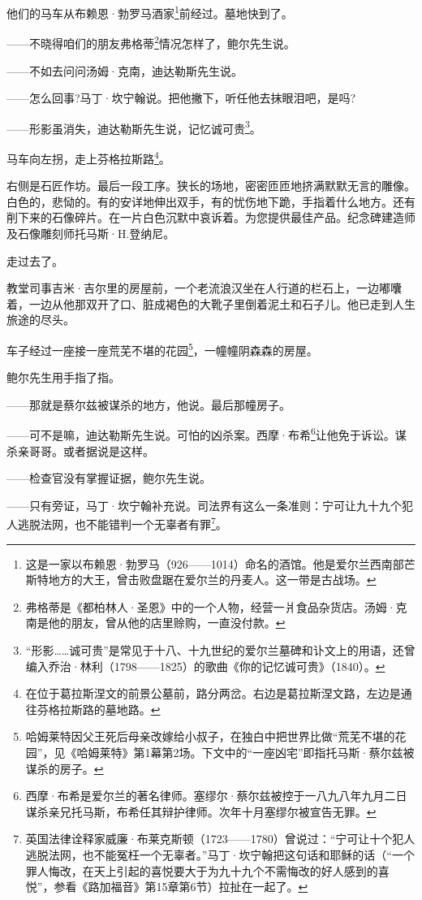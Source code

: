 \par 他们的马车从布赖恩·勃罗马酒家\footnote{这是一家以布赖恩·勃罗马（926——1014）命名的酒馆。他是爱尔兰西南部芒斯特地方的大王，曾击败盘踞在爱尔兰的丹麦人。这一带是古战场。}前经过。墓地快到了。
\par ——不晓得咱们的朋友弗格蒂\footnote{弗格蒂是《都柏林人·圣恩》中的一个人物，经营一爿食品杂货店。汤姆·克南是他的朋友，曾从他的店里赊购，一直没付款。}情况怎样了，鲍尔先生说。
\par ——不如去问问汤姆·克南，迪达勒斯先生说。
\par ——怎么回事?马丁·坎宁翰说。把他撇下，听任他去抹眼泪吧，是吗?
\par ——形影虽消失，迪达勒斯先生说，记忆诚可贵\footnote{“形影……诚可贵”是常见于十八、十九世纪的爱尔兰墓碑和讣文上的用语，还曾编入乔治·林利（1798——1825）的歌曲《你的记忆诚可贵》（1840）。}。
\par 马车向左拐，走上芬格拉斯路\footnote{在位于葛拉斯涅文的前景公墓前，路分两岔。右边是葛拉斯涅文路，左边是通往芬格拉斯路的墓地路。}。
\par 右侧是石匠作坊。最后一段工序。狭长的场地，密密匝匝地挤满默默无言的雕像。白色的，悲恸的。有的安详地伸出双手，有的忧伤地下跪，手指着什么地方。还有削下来的石像碎片。在一片白色沉默中哀诉着。为您提供最佳产品。纪念碑建造师及石像雕刻师托马斯·H.登纳尼。
\par 走过去了。
\par 教堂司事吉米·吉尔里的房屋前，一个老流浪汉坐在人行道的栏石上，一边嘟囔着，一边从他那双开了口、脏成褐色的大靴子里倒着泥土和石子儿。他已走到人生旅途的尽头。
\par 车子经过一座接一座荒芜不堪的花园\footnote{哈姆莱特因父王死后母亲改嫁给小叔子，在独白中把世界比做“荒芜不堪的花园”，见《哈姆莱特》第1幕第2场。下文中的“一座凶宅”即指托马斯·蔡尔兹被谋杀的房子。}，一幢幢阴森森的房屋。
\par 鲍尔先生用手指了指。
\par ——那就是蔡尔兹被谋杀的地方，他说。最后那幢房子。
\par ——可不是嘛，迪达勒斯先生说。可怕的凶杀案。西摩·布希\footnote{西摩·布希是爱尔兰的著名律师。塞缪尔·蔡尔兹被控于一八九八年九月二日谋杀亲兄托马斯，布希任其辩护律师。次年十月塞缪尔被宣告无罪。}让他免于诉讼。谋杀亲哥哥。或者据说是这样。
\par ——检查官没有掌握证据，鲍尔先生说。
\par ——只有旁证，马丁·坎宁翰补充说。司法界有这么一条准则：宁可让九十九个犯人逃脱法网，也不能错判一个无辜者有罪\footnote{英国法律诠释家威廉·布莱克斯顿（1723——1780）曾说过：“宁可让十个犯人逃脱法网，也不能冤枉一个无辜者。”马丁·坎宁翰把这句话和耶稣的话（“一个罪人悔改，在天上引起的喜悦要大于为九十九个不需悔改的好人感到的喜悦”，参看《路加福音》第15章第6节）拉扯在一起了。}。
